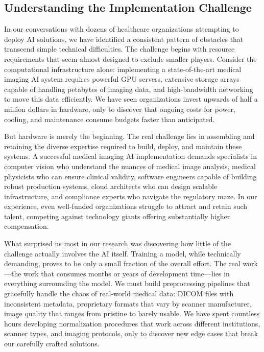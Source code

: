 \documentclass[12pt,a4paper]{article}
\begin{document}
\subsection{Understanding the Implementation Challenge}

In our conversations with dozens of healthcare organizations attempting to deploy AI solutions, we have identified a consistent pattern of obstacles that transcend simple technical difficulties. The challenge begins with resource requirements that seem almost designed to exclude smaller players. Consider the computational infrastructure alone: implementing a state-of-the-art medical imaging AI system requires powerful GPU servers, extensive storage arrays capable of handling petabytes of imaging data, and high-bandwidth networking to move this data efficiently. We have seen organizations invest upwards of half a million dollars in hardware, only to discover that ongoing costs for power, cooling, and maintenance consume budgets faster than anticipated. 

But hardware is merely the beginning. The real challenge lies in assembling and retaining the diverse expertise required to build, deploy, and maintain these systems. A successful medical imaging AI implementation demands specialists in computer vision who understand the nuances of medical image analysis, medical physicists who can ensure clinical validity, software engineers capable of building robust production systems, cloud architects who can design scalable infrastructure, and compliance experts who navigate the regulatory maze. In our experience, even well-funded organizations struggle to attract and retain such talent, competing against technology giants offering substantially higher compensation.

What surprised us most in our research was discovering how little of the challenge actually involves the AI itself. Training a model, while technically demanding, proves to be only a small fraction of the overall effort. The real work—the work that consumes months or years of development time—lies in everything surrounding the model. We must build preprocessing pipelines that gracefully handle the chaos of real-world medical data: DICOM files with inconsistent metadata, proprietary formats that vary by scanner manufacturer, image quality that ranges from pristine to barely usable. We have spent countless hours developing normalization procedures that work across different institutions, scanner types, and imaging protocols, only to discover new edge cases that break our carefully crafted solutions.
\end{document}
